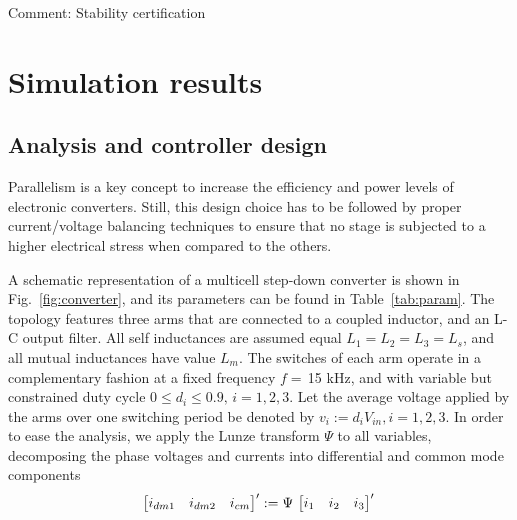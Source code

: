 Comment: Stability certification

\section{Simulation results}


\subsection{Analysis and controller design}
\label{sec:analysis}
Parallelism is a key concept to increase the efficiency and power levels of electronic converters. Still, this design choice has to be followed by proper current/voltage balancing techniques to ensure that no stage is subjected to a higher electrical stress when compared to the others. 

A schematic representation of a multicell step-down converter is shown in Fig.~\ref{fig:converter}, and its parameters can be found in Table~\ref{tab:param}. The topology features three arms that are connected to a coupled inductor, and an L-C output filter. All self inductances are assumed equal $L_1 = L_2 = L_3 = L_{s}$, and all mutual inductances have value $L_m$. The switches of each arm operate in a complementary fashion at a fixed frequency $f = \,$15 kHz, and with variable but constrained duty cycle $0 \leq d_i \leq 0.9, \, i=1,2,3$. Let the average voltage applied by the arms over one switching period be denoted by $v_i := d_i V_{in}, i=1,2,3$. In order to ease the analysis, we apply the Lunze transform $\Psi$ to all variables, decomposing the phase voltages and currents into differential and common mode components
\begin{equation}
	\begin{bmatrix}i_{dm1} & i_{dm2} & i_{cm}\end{bmatrix}' := \Psi \, \begin{bmatrix}i_{1} & i_{2} & i_{3}\end{bmatrix}' \\
\end{equation}
